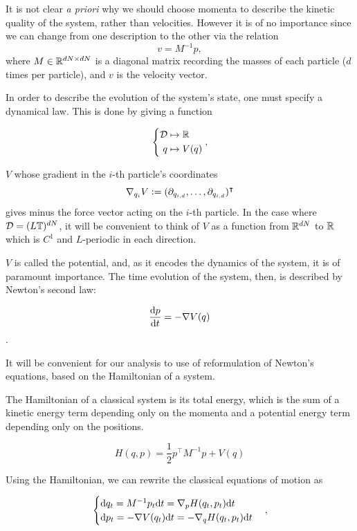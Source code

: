 It is not clear \textit{a priori} why we should choose momenta to describe the kinetic quality of the system, rather than velocities. However it is of no importance since we can change from one description to the other via the relation
$$v=M^{-1}p,$$
where $M\in \mathbb{R}^{dN \times dN}$ is a diagonal matrix recording the masses of each particle ($d$ times per particle), and $v$ is the velocity vector.


In order to describe the evolution of the system's state, one must specify a dynamical law. This is done by giving a function

\begin{equation*}
    \left\{ \begin{aligned} \mathcal{D} &\mapsto \mathbb{R} \\
                            q &\mapsto V(q) \end{aligned} \right. ,
\end{equation*}

$V$ whose gradient in the $i$-th particle's coordinates 
$$ \nabla_{q_i} V \mathrel{\mathop:}= (\partial_{q_{i,d}},\dots , \partial_{q_{i,d}})^\intercal $$
gives minus the force vector acting on the $i$-th particle. In the case where $\mathcal{D} = (L\mathbb T)^{dN}$, it will be convenient to think of $V$ as a function from $\mathbb{R}^{dN}$ to $\mathbb{R}$ which is $C^1$ and $L$-periodic in each direction.

$V$ is called the potential, and, as it encodes the dynamics of the system, it is of paramount importance. The time evolution of the system, then, is described by Newton's second law:

$$\frac{\text{d} p}{\text{d}t}=-\nabla V(q)$$.

It will be convenient for our analysis to use of reformulation of Newton's equations, based on the Hamiltonian of a system.

\begin{definition}[Hamiltonian]
    The Hamiltonian of a classical system is its total energy, which is the sum of a kinetic energy term depending only on the momenta and a potential energy term depending only on the positions.

    \begin{equation}
        H(q,p)=\frac12p^\intercal M^{-1}p+V(q)
    \end{equation}
\end{definition}

Using the Hamiltonian, we can rewrite the classical equations of motion as

\begin{equation}
\label{Hamiltonian dynamics}
\begin{cases}
    \text d q_t=M^{-1}p_t\text{d}t=\nabla_p H(q_t,p_t)\text{d}t\\
    \text d p_t=-\nabla V(q_t)\text{d}t=-\nabla_q H(q_t,p_t)\text{d}t
\end{cases},
\end{equation}

